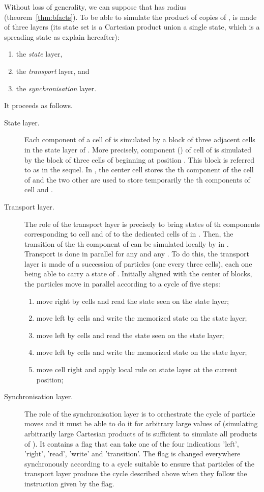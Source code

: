 \documentclass[a4paper]{elsarticle}
\begin{document}
Without loss of generality, we can suppose that  has radius 
(theorem~\ref{thm:bfacts}). To be able to simulate the product 
of  copies of ,  is made of three layers (its
state set is a Cartesian product union a single state, which is a
spreading state as explain hereafter):
  \begin{enumerate}
  \item the \emph{state} layer,
  \item the \emph{transport} layer, and
  \item the \emph{synchronisation} layer.
  \end{enumerate} It proceeds as follows.
\begin{description}
\item[State layer.] Each component of a cell of  is simulated by a block of
  three adjacent cells in the state layer of .  More
  precisely, component  () of cell  of 
  is simulated by the block of three cells of  beginning
  at position . This block is referred to as  in
  the sequel. In , the center cell stores the th
  component of the cell  of  and the two other are used to
  store temporarily the th components of cell  and .
\item[Transport layer.] The role of the transport layer is precisely to bring states of
  th components corresponding to cell  and  of  to
  the dedicated cells of  in . Then, the
  transition  of the th component of
   can be simulated locally by  in
  . Transport is done in parallel for any  and any
  . To do this, the transport layer is made of a succession of
  particles (one every three cells), each one being able to carry a
  state of . Initially aligned with the center of blocks, the
  particles move in parallel according to a cycle of five steps:
  \begin{enumerate}
  \item move right by  cells and read the state seen on the state layer;
  \item move left by  cells and write the memorized state on
    the state layer;
  \item move left by  cells and read the state seen on the state layer;
  \item move left by  cells and write the memorized state on
    the state layer;
  \item move  cell right and apply local rule  on state
    layer at the current position;
  \end{enumerate}
\item[Synchronisation layer.] The role of the synchronisation layer is
  to orchestrate the cycle of particle moves and it must be able to do
  it for arbitrary large values of  (simulating arbitrarily large
  Cartesian products of  is sufficient to simulate all products
  of ). It contains a flag that can take one of the four
  indications 'left', 'right', 'read', 'write' and 'transition'. The
  flag is changed everywhere synchronously according to a cycle
  suitable to ensure that particles of the transport layer produce the
  cycle described above when they follow the instruction given by the
  flag.
\end{description}
\end{document}
